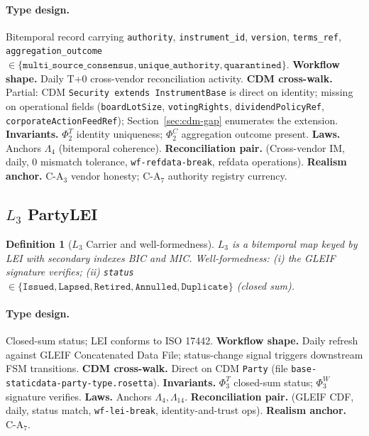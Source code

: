 \documentclass[11pt,a4paper]{article}
\newtheorem{definition}{Definition}[section]
\begin{document}
\paragraph{Type design.} Bitemporal record carrying \texttt{authority}, \texttt{instrument\_id}, \texttt{version}, \texttt{terms\_ref}, \texttt{aggregation\_outcome} $\in \{\texttt{multi\_source\_consensus}, \texttt{unique\_authority}, \texttt{quarantined}\}$. \textbf{Workflow shape.} Daily T+0 cross-vendor reconciliation activity. \textbf{CDM cross-walk.} Partial: CDM \texttt{Security extends InstrumentBase} is direct on identity; missing on operational fields (\texttt{boardLotSize}, \texttt{votingRights}, \texttt{dividendPolicyRef}, \texttt{corporateActionFeedRef}); Section~\ref{sec:cdm-gap} enumerates the extension. \textbf{Invariants.} $\Phi_2^T$ identity uniqueness; $\Phi_2^C$ aggregation outcome present. \textbf{Laws.} Anchors $\Lambda_4$ (bitemporal coherence). \textbf{Reconciliation pair.} (Cross-vendor IM, daily, 0 mismatch tolerance, \texttt{wf-refdata-break}, refdata operations). \textbf{Realism anchor.} $\mathrm{C\textrm{-}A}_3$ vendor honesty; $\mathrm{C\textrm{-}A}_7$ authority registry currency.

\subsection{$L_3$ PartyLEI}
\label{sec:leaf-l3}

\begin{definition}[$L_3$ Carrier and well-formedness]
$L_3$ is a bitemporal map keyed by LEI with secondary indexes BIC and MIC. Well-formedness: (i) the GLEIF signature verifies; (ii) \texttt{status} $\in \{\texttt{Issued}, \texttt{Lapsed}, \texttt{Retired}, \texttt{Annulled}, \texttt{Duplicate}\}$ (closed sum).
\end{definition}

\paragraph{Type design.} Closed-sum status; LEI conforms to ISO 17442. \textbf{Workflow shape.} Daily refresh against GLEIF Concatenated Data File; status-change signal triggers downstream FSM transitions. \textbf{CDM cross-walk.} Direct on CDM \texttt{Party} (file \texttt{base-staticdata-party-type.rosetta}). \textbf{Invariants.} $\Phi_3^T$ closed-sum status; $\Phi_3^W$ signature verifies. \textbf{Laws.} Anchors $\Lambda_4, \Lambda_{14}$. \textbf{Reconciliation pair.} (GLEIF CDF, daily, status match, \texttt{wf-lei-break}, identity-and-trust ops). \textbf{Realism anchor.} $\mathrm{C\textrm{-}A}_7$.
\end{document}

